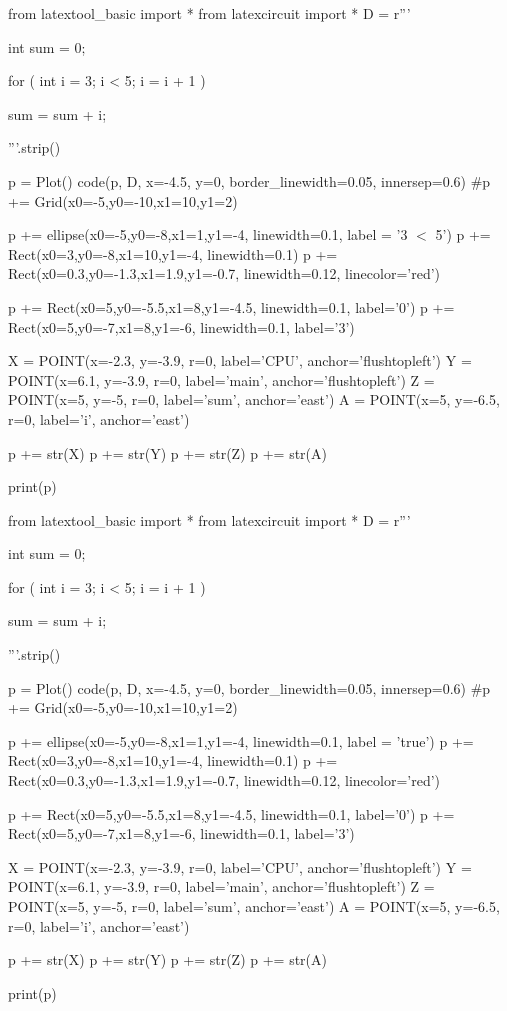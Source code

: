 \begin{python}
from latextool_basic import *
from latexcircuit import *
D = r'''



int sum = 0;

    for ( int i = 3;     i < 5;     i = i + 1 )


        sum = sum + i;



'''.strip()

p = Plot()
code(p, D, x=-4.5, y=0, border_linewidth=0.05, innersep=0.6)
#p += Grid(x0=-5,y0=-10,x1=10,y1=2)

p += ellipse(x0=-5,y0=-8,x1=1,y1=-4, linewidth=0.1, label = '3 $<$ 5')
p += Rect(x0=3,y0=-8,x1=10,y1=-4, linewidth=0.1)
p += Rect(x0=0.3,y0=-1.3,x1=1.9,y1=-0.7, linewidth=0.12, linecolor='red')

p += Rect(x0=5,y0=-5.5,x1=8,y1=-4.5, linewidth=0.1, label='0')
p += Rect(x0=5,y0=-7,x1=8,y1=-6, linewidth=0.1, label='3')

X = POINT(x=-2.3, y=-3.9, r=0, label='CPU', anchor='flushtopleft')
Y = POINT(x=6.1, y=-3.9, r=0, label='main', anchor='flushtopleft')
Z = POINT(x=5, y=-5, r=0, label='sum', anchor='east')
A = POINT(x=5, y=-6.5, r=0, label='i', anchor='east')

p += str(X)
p += str(Y)
p += str(Z)
p += str(A)

print(p)
\end{python}

\begin{python}
from latextool_basic import *
from latexcircuit import *
D = r'''



int sum = 0;

    for ( int i = 3;     i < 5;     i = i + 1 )


        sum = sum + i;



'''.strip()

p = Plot()
code(p, D, x=-4.5, y=0, border_linewidth=0.05, innersep=0.6)
#p += Grid(x0=-5,y0=-10,x1=10,y1=2)

p += ellipse(x0=-5,y0=-8,x1=1,y1=-4, linewidth=0.1, label = 'true')
p += Rect(x0=3,y0=-8,x1=10,y1=-4, linewidth=0.1)
p += Rect(x0=0.3,y0=-1.3,x1=1.9,y1=-0.7, linewidth=0.12, linecolor='red')

p += Rect(x0=5,y0=-5.5,x1=8,y1=-4.5, linewidth=0.1, label='0')
p += Rect(x0=5,y0=-7,x1=8,y1=-6, linewidth=0.1, label='3')

X = POINT(x=-2.3, y=-3.9, r=0, label='CPU', anchor='flushtopleft')
Y = POINT(x=6.1, y=-3.9, r=0, label='main', anchor='flushtopleft')
Z = POINT(x=5, y=-5, r=0, label='sum', anchor='east')
A = POINT(x=5, y=-6.5, r=0, label='i', anchor='east')

p += str(X)
p += str(Y)
p += str(Z)
p += str(A)

print(p)
\end{python}

